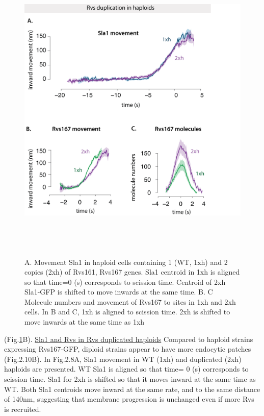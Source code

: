 				\begin{figure}[H]
	\centering
	\includegraphics[width=15cm,height=15cm,keepaspectratio]{figures/results_final/rvs_haploid4}
	\vspace*{2mm}
	\caption[Overexpression of Rvs in haploid cells]
	{A. Movement Sla1 in haploid cells containing 1 (WT, 1xh) and 2 copies (2xh) of Rvs161, Rvs167 genes. Sla1 centroid in 1xh is aligned so that time=0 (s) corresponds to scission time. Centroid of 2xh Sla1-GFP is shifted to move inwards at the same time. 
		B. C Molecule numbers and movement of Rvs167 to sites in 1xh and 2xh cells. In B and C, 1xh is aligned to scission time. 2xh is shifted to move inwards at the same time as 1xh
		\label{fig_rvshaploid}}
	
\end{figure}
 (Fig.\ref{fig_rvshaploid}B). 
 \underline{Sla1 and Rvs in Rvs duplicated haploids}
 Compared to haploid strains expressing Rvs167-GFP, diploid strains appear to have more endocytic patches (Fig.2.10B). In Fig.2.8A, Sla1 movement in WT (1xh) and duplicated (2xh) haploids are presented. WT Sla1 is aligned so that time= 0 (s) corresponds to scission time. Sla1 for 2xh is shifted so that it moves inward at the same time as WT. Both Sla1 centroids move inward at the same rate, and to the same distance of 140nm, suggesting that membrane progression is unchanged even if more Rvs is recruited. 

